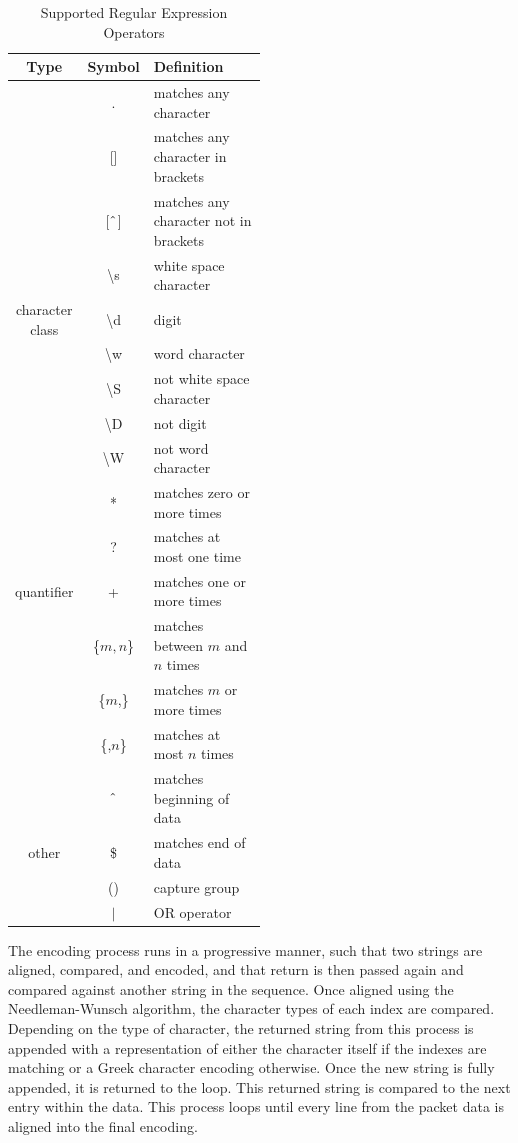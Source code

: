 \begin{table}
\begin{center}
\begin{tabular}{|c|c|p{0.5\linewidth}|}
  \hline
  Type & Symbol & Definition \\
  \hline
  & $.$ & matches any character \\
  \cline{2-3}
  & [] & matches any character in brackets \\
  \cline{2-3}
  & [$\string^$] & matches any character not in brackets \\
  \cline{2-3}
  & \textbackslash s & white space character \\
  \cline{2-3}
  character class & \textbackslash d & digit \\
  \cline{2-3}
  & \textbackslash w & word character \\
  \cline{2-3}
  & \textbackslash S & not white space character \\
  \cline{2-3}
  & \textbackslash D & not digit \\
  \cline{2-3}
  & \textbackslash W & not word character \\
  \hline
  & * & matches zero or more times \\
  \cline{2-3}
  & ? & matches at most one time \\
  \cline{2-3}
  quantifier & + & matches one or more times \\ \cline{2-3}
  & \{$m,n$\} & matches between $m$ and $n$ times \\
  \cline{2-3}
  & \{$m$,\} & matches $m$ or more times \\
  \cline{2-3}
  & \{,$n$\} & matches at most $n$ times \\
  \hline
  & $\string^$ & matches beginning of data \\
  \cline{2-3}
  other & \$ & matches end of data \\
  \cline{2-3}
  & () & capture group \\
  \cline{2-3}
  & $\vert$ & OR operator \\
  \hline
\end{tabular}
\caption{Supported Regular Expression Operators}
\label{table:regexes}
\end{center}
\end{table}

The encoding process runs in a progressive manner, such that two strings are aligned, compared, and encoded, and that return is then passed again and compared against another string in the sequence. Once aligned using the Needleman-Wunsch algorithm, the character types of each index are compared. Depending on the type of character, the returned string from this process is appended with a representation of either the character itself if the indexes are matching or a Greek character encoding otherwise. Once the new string is fully appended, it is returned to the loop. This returned string is compared to the next entry within the data. This process loops until every line from the packet data is aligned into the final encoding.

